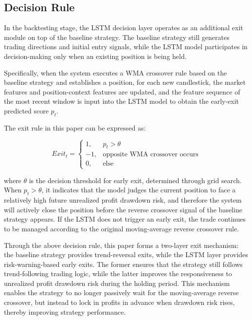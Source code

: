 \documentclass[12pt]{article}
\begin{document}
\subsection{Decision Rule}

In the backtesting stage, the LSTM decision layer operates as an additional exit module on top of the baseline strategy. The baseline strategy still generates trading directions and initial entry signals, while the LSTM model participates in decision-making only when an existing position is being held.

Specifically, when the system executes a WMA crossover rule based on the baseline strategy and establishes a position, for each new candlestick, the market features and position-context features are updated, and the feature sequence of the most recent window is input into the LSTM model to obtain the early-exit predicted score $p_t$.

The exit rule in this paper can be expressed as:

\begin{equation}
    Exit_t =
    \begin{cases}
    1, & p_t > \theta \\
    -1, & \text{opposite WMA crossover occurs} \\
    0, & \text{else}
    \end{cases}
\end{equation}

where $\theta$ is the decision threshold for early exit, determined through grid search. When $p_t > \theta$, it indicates that the model judges the current position to face a relatively high future unrealized profit drawdown risk, and therefore the system will actively close the position before the reverse crossover signal of the baseline strategy appears. If the LSTM does not trigger an early exit, the trade continues to be managed according to the original moving-average reverse crossover rule.

Through the above decision rule, this paper forms a two-layer exit mechanism: the baseline strategy provides trend-reversal exits, while the LSTM layer provides risk-warning-based early exits. The former ensures that the strategy still follows trend-following trading logic, while the latter improves the responsiveness to unrealized profit drawdown risk during the holding period. This mechanism enables the strategy to no longer passively wait for the moving-average reverse crossover, but instead to lock in profits in advance when drawdown risk rises, thereby improving strategy performance.
\end{document}
